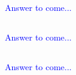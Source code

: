 \documentclass[a4paper,12pt]{article}
\begin{document}
\subsection{}

\textcolor{blue}{
Answer to come...
}
\subsection{}

\textcolor{blue}{
Answer to come...
}
\subsection{}

\textcolor{blue}{
Answer to come...
}
\end{document}
